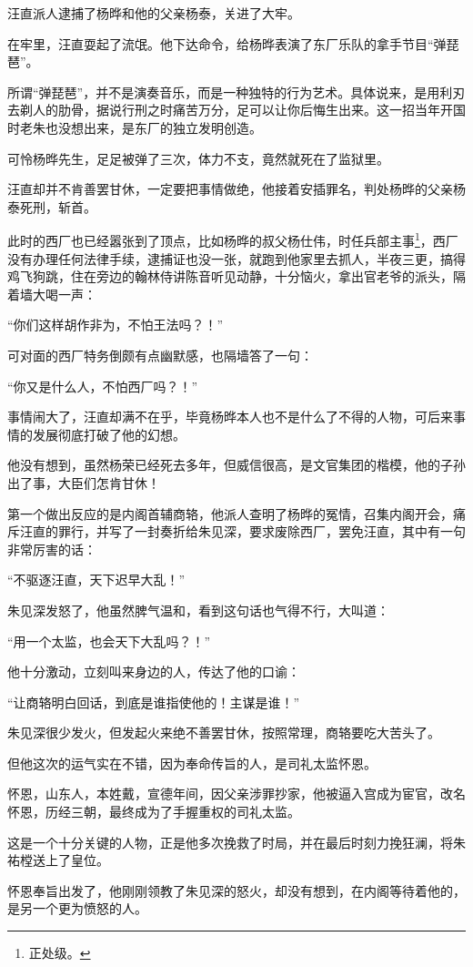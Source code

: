 \begin{multicols}{\theparacolNo}
汪直派人逮捕了杨晔和他的父亲杨泰，关进了大牢。

在牢里，汪直耍起了流氓。他下达命令，给杨晔表演了东厂乐队的拿手节目“弹琵琶”。

所谓“弹琵琶”，并不是演奏音乐，而是一种独特的行为艺术。具体说来，是用利刃去剃人的肋骨，据说行刑之时痛苦万分，足可以让你后悔生出来。这一招当年开国时老朱也没想出来，是东厂的独立发明创造。

可怜杨晔先生，足足被弹了三次，体力不支，竟然就死在了监狱里。

汪直却并不肯善罢甘休，一定要把事情做绝，他接着安插罪名，判处杨晔的父亲杨泰死刑，斩首。

此时的西厂也已经嚣张到了顶点，比如杨晔的叔父杨仕伟，时任兵部主事\footnote{正处级。}，西厂没有办理任何法律手续，逮捕证也没一张，就跑到他家里去抓人，半夜三更，搞得鸡飞狗跳，住在旁边的翰林侍讲陈音听见动静，十分恼火，拿出官老爷的派头，隔着墙大喝一声：

“你们这样胡作非为，不怕王法吗？！”

可对面的西厂特务倒颇有点幽默感，也隔墙答了一句：

“你又是什么人，不怕西厂吗？！”

事情闹大了，汪直却满不在乎，毕竟杨晔本人也不是什么了不得的人物，可后来事情的发展彻底打破了他的幻想。

他没有想到，虽然杨荣已经死去多年，但威信很高，是文官集团的楷模，他的子孙出了事，大臣们怎肯甘休！

第一个做出反应的是内阁首辅商辂，他派人查明了杨晔的冤情，召集内阁开会，痛斥汪直的罪行，并写了一封奏折给朱见深，要求废除西厂，罢免汪直，其中有一句非常厉害的话：

“不驱逐汪直，天下迟早大乱！”

朱见深发怒了，他虽然脾气温和，看到这句话也气得不行，大叫道：

“用一个太监，也会天下大乱吗？！”

他十分激动，立刻叫来身边的人，传达了他的口谕：

“让商辂明白回话，到底是谁指使他的！主谋是谁！”

朱见深很少发火，但发起火来绝不善罢甘休，按照常理，商辂要吃大苦头了。

但他这次的运气实在不错，因为奉命传旨的人，是司礼太监怀恩。

怀恩，山东人，本姓戴，宣德年间，因父亲涉罪抄家，他被逼入宫成为宦官，改名怀恩，历经三朝，最终成为了手握重权的司礼太监。

这是一个十分关键的人物，正是他多次挽救了时局，并在最后时刻力挽狂澜，将朱祐樘送上了皇位。

怀恩奉旨出发了，他刚刚领教了朱见深的怒火，却没有想到，在内阁等待着他的，是另一个更为愤怒的人。


\end{multicols}

